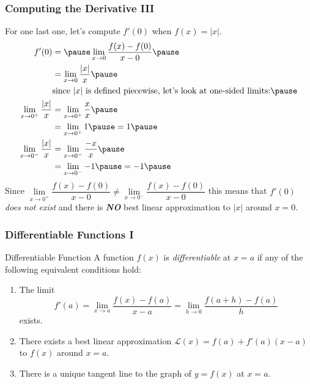 \documentclass{ltx-talk}
\begin{document}
\begin{frame}
  \frametitle{Computing the Derivative III}
  For one last one, let's compute $f'(0)$ when $f(x) = | x|$. \pause
  \begin{align}
    f'(0) &= \pause \lim \limits_{x \rightarrow 0} \dfrac{f(x) - f(0)}{x - 0} \pause \\
          &= \lim \limits_{x \rightarrow 0} \dfrac{|x|}{x} \pause \\
          &\text{since $|x|$ is defined piecewise, let's look at one-sided limits:} \pause \\
    \lim_{x \rightarrow 0^{+}} \dfrac{|x|}{x} &= \lim_{x \rightarrow 0^{+}} \dfrac{x}{x} \pause \\
                                              &= \lim_{x \rightarrow 0^{+}} 1 \pause = 1 \pause \\
    \lim_{x \rightarrow 0^{-}} \dfrac{|x|}{x} &= \lim_{x \rightarrow 0^{-}} \dfrac{-x}{x} \pause \\
                                              &= \lim_{x \rightarrow 0^{-}} -1 \pause = -1 \pause
  \end{align}
  Since $\lim\limits_{x \rightarrow 0^{+}} \dfrac{f(x) - f(0)}{x - 0} \neq \lim\limits_{x \rightarrow 0^{-}} \dfrac{f(x) - f(0)}{x - 0}$ \pause
  this means that $f'(0)$ \textit{does not exist} \pause
  and there is \textit{\textbf{NO}} best linear approximation to $|x|$ around $x = 0$.
\end{frame}

\begin{frame}
  \frametitle{Differentiable Functions I}

  \begin{block}{Differentiable Function}
    A function $f(x)$ is \textit{differentiable} at $x = a$ if any of the following equivalent conditions hold: \pause
    \begin{enumerate}
      \item The limit 
        \begin{equation}
          f'(a) = \lim\limits_{x \rightarrow a} \dfrac{f(x) - f(a)}{x - a} = \lim\limits_{h \rightarrow 0} \dfrac{f(a + h) - f(a)}{h}
        \end{equation} exists. \pause
      \item There exists a best linear approximation $\mathscr{L}(x) = f(a) + f'(a)(x - a)$ to $f(x)$ around $x = a$. \pause
      \item There is a unique tangent line to the graph of $y = f(x)$ at $x = a$.
    \end{enumerate}
  \end{block}
\end{frame}
\end{document}
